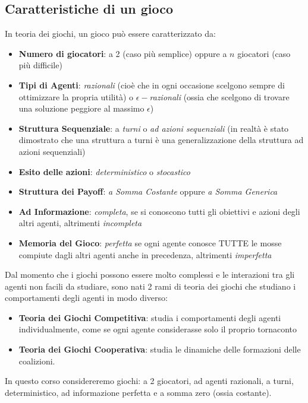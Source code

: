 \subsection{Caratteristiche di un gioco}
In teoria dei giochi, un gioco può essere caratterizzato da:
\begin{itemize}
    \item \textbf{Numero di giocatori}: a 2 (caso più semplice) oppure a $n$ giocatori (caso più difficile)
    \item \textbf{Tipi di Agenti}: \textit{razionali} (cioè che in ogni occasione scelgono sempre di ottimizzare la propria utilità) o \textit{$\epsilon-$razionali} (ossia che scelgono di trovare una soluzione peggiore al massimo $\epsilon$)
    \item \textbf{Struttura Sequenziale}: a \textit{turni} o \textit{ad azioni sequenziali} (in realtà è stato dimostrato che una struttura a turni è una generalizzazione della struttura ad azioni sequenziali)
    \item \textbf{Esito delle azioni}: \textit{deterministico} o \textit{stocastico}
    \item \textbf{Struttura dei Payoff}: \textit{a Somma Costante} oppure \textit{a Somma Generica}
    \item \textbf{Ad Informazione}: \textit{completa}, se si conoscono tutti gli obiettivi e azioni degli altri agenti, altrimenti \textit{incompleta}
    \item \textbf{Memoria del Gioco}: \textit{perfetta} se ogni agente conosce TUTTE le mosse compiute dagli altri agenti anche in precedenza, altrimenti \textit{imperfetta}
\end{itemize}
Dal momento che i giochi possono essere molto complessi e le interazioni tra gli agenti non facili da studiare, sono nati 2 rami di teoria dei giochi che studiano i comportamenti
degli agenti in modo diverso:
\begin{itemize}
    \item \textbf{Teoria dei Giochi Competitiva}: studia i comportamenti degli agenti individualmente, come se ogni agente considerasse solo il proprio tornaconto
    \item \textbf{Teoria dei Giochi Cooperativa}: studia le dinamiche delle formazioni delle coalizioni.
\end{itemize}

\begin{tcolorbox}[documentation note, title={Nota Importante}]
   In questo corso considereremo giochi: a 2 giocatori, ad agenti razionali, a turni, deterministico, ad informazione perfetta e a somma zero (ossia costante).
\end{tcolorbox}

